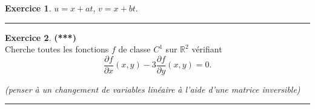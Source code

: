 \documentclass[a4paper,11pt]{article}
\theoremstyle{definition}
\newtheorem{exo}{Exercice} %
\begin{document}
\begin{minipage}{1\linewidth}
\begin{minipage}[t]{0.48\linewidth}
\begin{exo}
	$u=x+at$, $v=x+bt$.
	\centering\rule{1\linewidth}{0.6pt}\end{exo}




\begin{exo}\textbf{(***)}\quad\\[0.2cm]
		Cherche toutes les fonctions $f$ de classe $C^1$ sur $\mathbb R^2$ vérifiant 
		$$\frac{\partial f}{\partial x}(x,y)-3\frac{\partial f}{\partial y}(x,y)=0.$$
		
		\textit{(penser à un changement de variables linéaire à l'aide d'une matrice inversible)}
	
	\centering\rule{1\linewidth}{0.6pt}\end{exo}


\end{minipage}\end{minipage} \newpage
\end{document}

